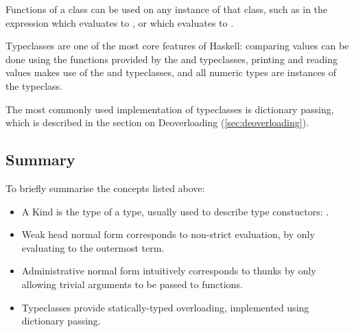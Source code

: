 \documentclass[dissertation.tex]{subfiles}
\begin{document}
{{        Functions of a class can be used on any instance of that class, such as in the expression  which evaluates to \haskell{[2,4,6]}, or  which evaluates to .

        Typeclasses are one of the most core features of Haskell: comparing values can be done using the functions provided by the  and  typeclasses, printing and reading values makes use of the  and  typeclasses, and all numeric types are instances of the  typeclass. 

        The most commonly used implementation of typeclasses is dictionary passing, which is described in the section on Deoverloading (\ref{sec:deoverloading}).
    }
    \subsection{Summary}
    {
        To briefly summarise the concepts listed above:

        \begin{itemize}
        \item A Kind is the type of a type, usually used to describe type constuctors: .
        \item Weak head normal form corresponds to non-strict evaluation, by only evaluating to the outermost term.
        \item
        {
            Administrative normal form intuitively corresponds to thunks by only allowing trivial arguments to be
            passed to functions.
        }
        \item Typeclasses provide statically-typed overloading, implemented using dictionary passing.
        \end{itemize}
    }
}
\end{document}
